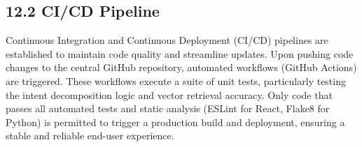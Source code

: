 \subsection*{12.2 CI/CD Pipeline}
Continuous Integration and Continuous Deployment (CI/CD) pipelines are established to maintain code quality and streamline updates. Upon pushing code changes to the central GitHub repository, automated workflows (GitHub Actions) are triggered. These workflows execute a suite of unit tests, particularly testing the intent decomposition logic and vector retrieval accuracy. Only code that passes all automated tests and static analysis (ESLint for React, Flake8 for Python) is permitted to trigger a production build and deployment, ensuring a stable and reliable end-user experience.
